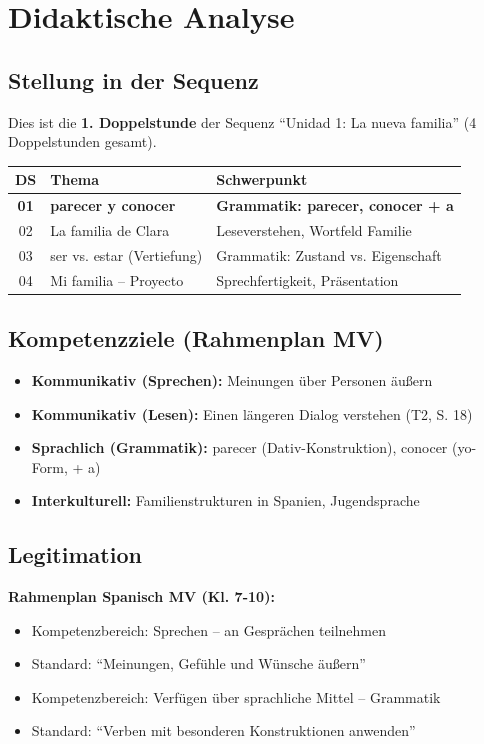 \documentclass[11pt,a4paper]{article}
\newcommand{\reihenthema}{Unidad 1: La nueva familia}
\begin{document}
\section{Didaktische Analyse}

\subsection{Stellung in der Sequenz}
Dies ist die \textbf{1. Doppelstunde} der Sequenz ``\reihenthema'' (4 Doppelstunden gesamt).

\begin{tabular}{|c|l|l|}
\hline
\textbf{DS} & \textbf{Thema} & \textbf{Schwerpunkt} \\
\hline
\textbf{01} & \textbf{parecer y conocer} & \textbf{Grammatik: parecer, conocer + a} \\
\hline
02 & La familia de Clara & Leseverstehen, Wortfeld Familie \\
\hline
03 & ser vs. estar (Vertiefung) & Grammatik: Zustand vs. Eigenschaft \\
\hline
04 & Mi familia -- Proyecto & Sprechfertigkeit, Präsentation \\
\hline
\end{tabular}

\subsection{Kompetenzziele (Rahmenplan MV)}
\begin{itemize}
    \item \textbf{Kommunikativ (Sprechen):} Meinungen über Personen äußern
    \item \textbf{Kommunikativ (Lesen):} Einen längeren Dialog verstehen (T2, S. 18)
    \item \textbf{Sprachlich (Grammatik):} parecer (Dativ-Konstruktion), conocer (yo-Form, + a)
    \item \textbf{Interkulturell:} Familienstrukturen in Spanien, Jugendsprache
\end{itemize}

\subsection{Legitimation}
\textbf{Rahmenplan Spanisch MV (Kl. 7-10):}
\begin{itemize}
    \item Kompetenzbereich: Sprechen -- an Gesprächen teilnehmen
    \item Standard: ``Meinungen, Gefühle und Wünsche äußern''
    \item Kompetenzbereich: Verfügen über sprachliche Mittel -- Grammatik
    \item Standard: ``Verben mit besonderen Konstruktionen anwenden''
\end{itemize}
\end{document}
